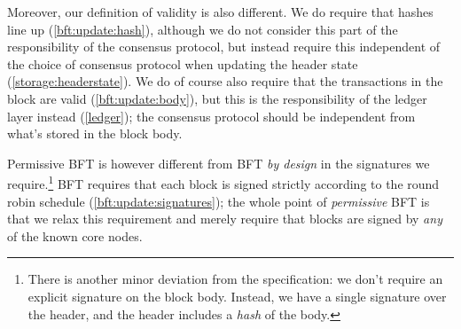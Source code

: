 \begin{description}
  Moreover, our definition of validity is also different. We do require that
  hashes line up (\cref{bft:update:hash}), although we do not consider this part
  of the responsibility of the consensus protocol, but instead require this
  independent of the choice of consensus protocol when updating the header state
  (\cref{storage:headerstate}). We do of course also require that the transactions in
  the block are valid (\cref{bft:update:body}), but this is the responsibility
  of the ledger layer instead (\cref{ledger}); the consensus protocol should be
  independent from what's stored in the block body.

  Permissive BFT is however different from BFT \emph{by design} in the
  signatures we require.\footnote{\label{footnote:singlesignature}There is
  another minor deviation from the specification: we don't require an explicit
  signature on the block body. Instead, we have a single signature over the
  header, and the header includes a \emph{hash} of the body.} BFT requires that
  each block is signed strictly according to the round robin schedule
  (\cref{bft:update:signatures}); the whole point of \emph{permissive} BFT is
  that we relax this requirement and merely require that blocks are signed by
  \emph{any} of the known core nodes.


\end{description}
